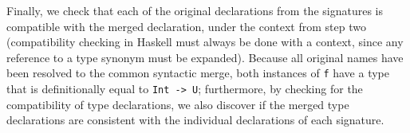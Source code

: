 Finally, we check that each of the original declarations from the signatures
is compatible with the merged declaration, under the context from
step two (compatibility checking in Haskell must always be done with
a context, since any reference to a type synonym must be
expanded).  Because all original names have been resolved to
the common syntactic merge, both instances of \verb|f| have a type that
is definitionally equal to \verb|Int -> U|; furthermore, by checking for
the compatibility of type declarations, we also discover if the merged
type declarations are consistent with the individual declarations of
each signature.



